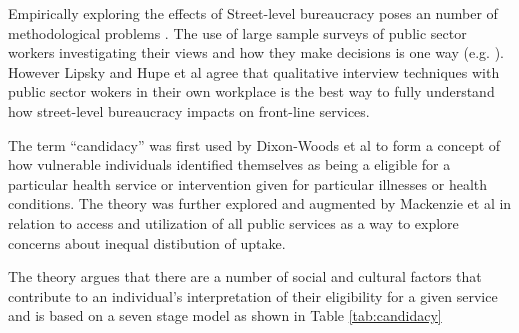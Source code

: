 \documentclass[12pt,]{report}
\begin{document}
Empirically exploring the effects of Street-level bureaucracy poses an
number of methodological problems \citep{RN428}. The use of large sample
surveys of public sector workers investigating their views and how they
make decisions is one way (e.g. \citep{RN427}). However Lipsky
\citeyearpar{RN430} and Hupe et al \citeyearpar{RN428} agree that
qualitative interview techniques with public sector wokers in their own
workplace is the best way to fully understand how street-level
bureaucracy impacts on front-line services.

The term ``candidacy'' was first used by Dixon-Woods et al
\citetext{\citeyear{RN438}; \citeyear{RN437}} to form a concept of how
vulnerable individuals identified themselves as being a eligible for a
particular health service or intervention given for particular illnesses
or health conditions. The theory was further explored and augmented by
Mackenzie et al \citetext{\citeyear{RN84}; \citeyear{RN434}} in relation
to access and utilization of all public services as a way to explore
concerns about inequal distibution of uptake.

The theory argues that there are a number of social and cultural factors
that contribute to an individual's interpretation of their eligibility
for a given service and is based on a seven stage model as shown in
Table \ref{tab:candidacy}
\end{document}
